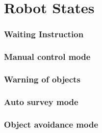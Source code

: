\documentclass[10pt,a4paper]{article}
\begin{document}
	\part{Robot States}
	\section{Waiting Instruction}
	\section{Manual control mode}
	\section{Warning of objects}
	\section{Auto survey mode}
	\section{Object avoidance mode}
\end{document}
